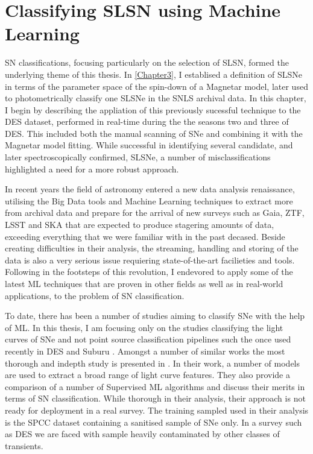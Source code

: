 \chapter{Classifying SLSN using Machine Learning}
\label{Chapter5}

SN classifications, focusing particularly on the selection of SLSN, formed the underlying theme of this thesis. In \cref{Chapter3}, I establised a definition of SLSNe in terms of the parameter space of the spin-down of a Magnetar model, later used to photometrically classify one SLSNe in the SNLS archival data. In this chapter, I begin by describing the appliation of this previously sucessful technique to the DES dataset, performed in real-time during the the seasons two and three of DES. This included both the manual scanning of SNe and combining it with the Magnetar model fitting. While successful in identifying several candidate, and later spectroscopically confirmed, SLSNe, a number of misclassifications highlighted a need for a more robust approach.

In recent years the field of astronomy entered a new data analysis renaissance, utilising the Big Data tools and Machine Learning techniques to extract more from archival data and prepare for the arrival of new surveys such as Gaia, ZTF, LSST and SKA that are expected to produce stagering amounts of data, exceeding everything that we were familiar with in the past decased. Beside creating difficulties in their analysis, the streaming, handling and storing of the data is also a very serious issue requiering state-of-the-art facilieties and tools. Following in the footsteps of this revolution, I endevored to apply some of the latest ML techniques that are proven in other fields as well as in real-world applications, to the problem of SN classification.

To date, there has been a number of studies aiming to classify SNe with the help of ML. In this thesis, I am focusing only on the studies classifying the light curves of SNe and not point source classification pipelines such the once used recently in DES \citep{Goldstein2015} and Suburu \citep{Morii2016}. Amongst a number of similar works \citep{Karpenka2012,Moller2016,Charnock2016} the most thorough and indepth study is presented in \citet{Lochner2016}. In their work, a number of models are used to extract a broad range of light curve features. They also provide a comparison of a number of Supervised ML algorithms and discuss their merits in terms of SN classification. While thorough in their analysis, their approach is not ready for deployment in a real survey. The training sampled used in their analysis is the SPCC dataset containing a sanitised sample of SNe only. In a survey such as DES we are faced with sample heavily contaminated by other classes of transients.

